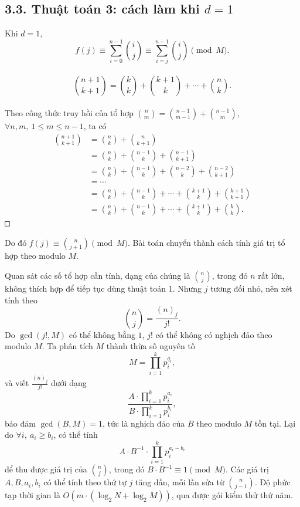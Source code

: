 \documentclass[11pt]{article}
\newcommand{\square}{\mathord{\vcenter{\hrule height .5pt
  \hbox{\vrule width .5pt height 5pt\kern5pt\vrule width .5pt}
  \hrule height .5pt}}}
\begin{document}
\subsection*{3.3. Thuật toán 3: cách làm khi \(d=1\)}

Khi \(d=1\),
\[
  f(j)\equiv \sum_{i=0}^{n-1}\binom{i}{j}
  \equiv \sum_{i=j}^{n-1}\binom{i}{j}\pmod M.
\]

\paragraph{}
\[
  \binom{n+1}{k+1}=\binom{k}{k}+\binom{k+1}{k}+\cdots+\binom{n}{k}.
\]

\paragraph{}
Theo công thức truy hồi của tổ hợp
\(\binom{n}{m}=\binom{n-1}{m-1}+\binom{n-1}{m}\),
\(\forall n,m,\ 1\le m\le n-1\), ta có
\[
\begin{aligned}
  \binom{n+1}{k+1}
  &=\binom{n}{k}+\binom{n}{k+1}\\
  &=\binom{n}{k}+\binom{n-1}{k}+\binom{n-1}{k+1}\\
  &=\binom{n}{k}+\binom{n-1}{k}+\binom{n-2}{k}
    +\binom{n-2}{k+1}\\
  &=\cdots\\
  &=\binom{n}{k}+\binom{n-1}{k}+\cdots+\binom{k+1}{k}
    +\binom{k+1}{k+1}\\
  &=\binom{n}{k}+\binom{n-1}{k}+\cdots+\binom{k+1}{k}
    +\binom{k}{k}.
\end{aligned}
\]
\(\square\)

Do đó \(f(j)\equiv \binom{n}{j+1}\pmod M\). Bài toán chuyển thành cách tính
giá trị tổ hợp theo modulo \(M\).

Quan sát các số tổ hợp cần tính, dạng của chúng là \(\binom{n}{j}\), trong đó
\(n\) rất lớn, không thích hợp để tiếp tục dùng thuật toán 1. Nhưng \(j\)
tương đối nhỏ, nên xét tính theo
\[
  \binom{n}{j}=\frac{(n)_j}{j!}.
\]
Do \(\gcd(j!,M)\) có thể không bằng \(1\), \(j!\) có thể không có nghịch đảo
theo modulo \(M\). Ta phân tích \(M\) thành thừa số nguyên tố
\[
  M=\prod_{i=1}^{k}p_i^{q_i},
\]
và viết \(\frac{(n)_j}{j!}\) dưới dạng
\[
  \frac{A\cdot\prod_{i=1}^{k}p_i^{a_i}}
       {B\cdot\prod_{i=1}^{k}p_i^{b_i}},
\]
bảo đảm \(\gcd(B,M)=1\), tức là nghịch đảo của \(B\) theo modulo \(M\) tồn
tại. Lại do \(\forall i,\ a_i\ge b_i\), có thể tính
\[
  A\cdot B^{-1}\cdot\prod_{i=1}^{k}p_i^{a_i-b_i}
\]
để thu được giá trị của \(\binom{n}{j}\), trong đó \(B\cdot B^{-1}\equiv1
\pmod M\). Các giá trị \(A,B,a_i,b_i\) có thể tính theo thứ tự \(j\) tăng dần,
mỗi lần sửa từ \(\binom{n}{j-1}\). Độ phức tạp thời gian là
\(O(m\cdot(\log_2 N+\log_2 M))\), qua được gói kiểm thử thứ năm.
\end{document}
